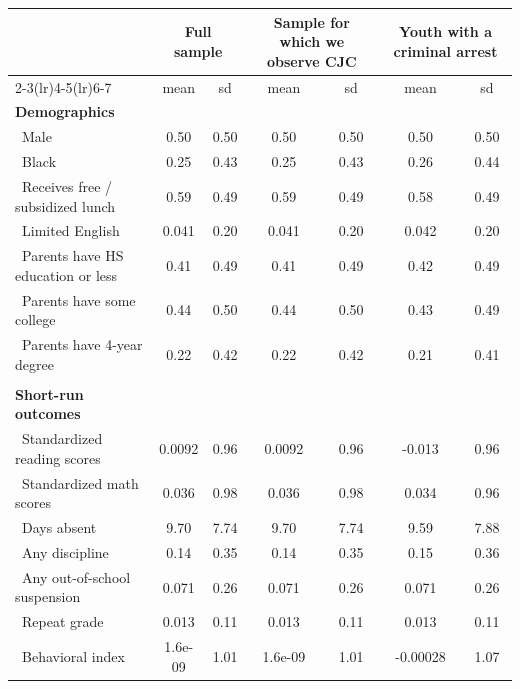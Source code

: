 {
\def\sym#1{\ifmmode^{#1}\else\(^{#1}\)\fi}
\begin{tabular}{l*{3}{cc}}
\hline\hline
            &\multicolumn{2}{c}{Full sample}&\multicolumn{2}{c}{Sample for which we observe CJC}&\multicolumn{2}{c}{Youth with a criminal arrest}\\\cmidrule(lr){2-3}\cmidrule(lr){4-5}\cmidrule(lr){6-7}
            &        mean&          sd&        mean&          sd&        mean&          sd\\
\hline
\textbf{Demographics}\\ \ Male&        0.50&        0.50&        0.50&        0.50&        0.50&        0.50\\
\ Black     &        0.25&        0.43&        0.25&        0.43&        0.26&        0.44\\
\ Receives free / subsidized lunch&        0.59&        0.49&        0.59&        0.49&        0.58&        0.49\\
\ Limited English&       0.041&        0.20&       0.041&        0.20&       0.042&        0.20\\
\ Parents have HS education or less&        0.41&        0.49&        0.41&        0.49&        0.42&        0.49\\
\ Parents have some college&        0.44&        0.50&        0.44&        0.50&        0.43&        0.49\\
\ Parents have 4-year degree&        0.22&        0.42&        0.22&        0.42&        0.21&        0.41\\
\\ \textbf{Short-run outcomes}\\ \ Standardized reading scores&      0.0092&        0.96&      0.0092&        0.96&      -0.013&        0.96\\
\ Standardized math scores&       0.036&        0.98&       0.036&        0.98&       0.034&        0.96\\
\ Days absent&        9.70&        7.74&        9.70&        7.74&        9.59&        7.88\\
\ Any discipline&        0.14&        0.35&        0.14&        0.35&        0.15&        0.36\\
\ Any out-of-school suspension&       0.071&        0.26&       0.071&        0.26&       0.071&        0.26\\
\ Repeat grade&       0.013&        0.11&       0.013&        0.11&       0.013&        0.11\\
\ Behavioral index&     1.6e-09&        1.01&     1.6e-09&        1.01&    -0.00028&        1.07\\

\end{tabular}}
